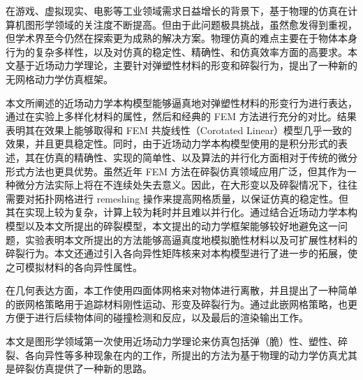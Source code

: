 \begin{cabstract}
在游戏、虚拟现实、电影等工业领域需求日益增长的背景下，基于物理的仿真在计算机图形学领域的关注度不断提高。但由于此问题极具挑战，虽然愈发得到重视，但学术界至今仍然在探索更为成熟的解决方案。物理仿真的难点主要在于物体本身行为的复杂多样性，以及对仿真的稳定性、精确性、和仿真效率方面的高要求。本文基于近场动力学理论，主要针对弹塑性材料的形变和碎裂行为，提出了一种新的无网格动力学仿真框架。

本文所阐述的近场动力学本构模型能够逼真地对弹塑性材料的形变行为进行表达，通过在实验上多样化材料的属性，然后和经典的 FEM 方法进行充分的对比。结果表明其在效果上能够取得和 FEM 共旋线性（Corotated Linear）模型几乎一致的效果，并且更具稳定性。同时，由于近场动力学本构模型使用的是积分形式的表述，其在仿真的精确性、实现的简单性、以及算法的并行化方面相对于传统的微分形式方法也更具优势。虽然近年 FEM 方法在碎裂仿真领域应用广泛，但其作为一种微分方法实际上将在不连续处失去意义。因此，在大形变以及碎裂情况下，往往需要对拓扑网格进行 remeshing 操作来提高网格质量，以保证仿真的稳定性。但其在实现上较为复杂，计算上较为耗时并且难以并行化。通过结合近场动力学本构模型以及本文所提出的碎裂模型，本文提出的动力学框架能够较好地避免这一问题，实验表明本文所提出的方法能够高逼真度地模拟脆性材料以及可扩展性材料的碎裂行为。本文还通过引入各向异性矩阵核来对本构模型进行了进一步的拓展，使之可模拟材料的各向异性属性。

在几何表达方面，本工作使用四面体网格来对物体进行离散，并且提出了一种简单的嵌网格策略用于追踪材料刚性运动、形变及碎裂行为。通过此嵌网格策略，也更方便于进行后续物体间的碰撞检测和反应，以及最后的渲染输出工作。

本文是图形学领域第一次使用近场动力学理论来仿真包括弹（脆）性、塑性、碎裂、各向异性等多种现象在内的工作，所提出的方法为基于物理的动力学仿真尤其是碎裂仿真提供了一种新的思路。

\end{cabstract}

